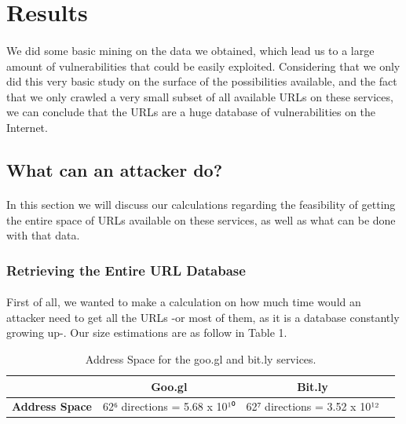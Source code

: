 \documentclass[12pt]{article}
\begin{document}
\section{Results}

\paragraph{}
We did some basic mining on the data we obtained, which lead us to a large amount of vulnerabilities that could be easily exploited. Considering that we only did this very basic study on the surface of the possibilities available, and the fact that we only crawled a very small subset of all available URLs on these services, we can conclude that the URLs are a huge database of vulnerabilities on the Internet.

\subsection{What can an attacker do?}

\paragraph{}
In this section we will discuss our calculations regarding the feasibility of getting the entire space of URLs available on these services, as well as what can be done with that data.

\subsubsection{Retrieving the Entire URL Database}

\paragraph{}
First of all, we wanted to make a calculation on how much time would an attacker need to get all the URLs -or most of them, as it is a database constantly growing up-. Our size estimations are as follow in Table 1.

\begin{table}[h]
	\centering
		\begin{tabular}{ | l | c | c | c |}
 			\hline
			  & \textbf{Goo.gl} & \textbf{Bit.ly} \\ \hline
 			\textbf{Address Space} & 62⁶ directions = 5.68 x 10¹⁰ & 62⁷ directions = 3.52 x 10¹² \\
 			\hline
  		\end{tabular}
	\caption[A table]{Address Space for the goo.gl and bit.ly services.}
	\label{tab:albums}
\end{table}
\end{document}
